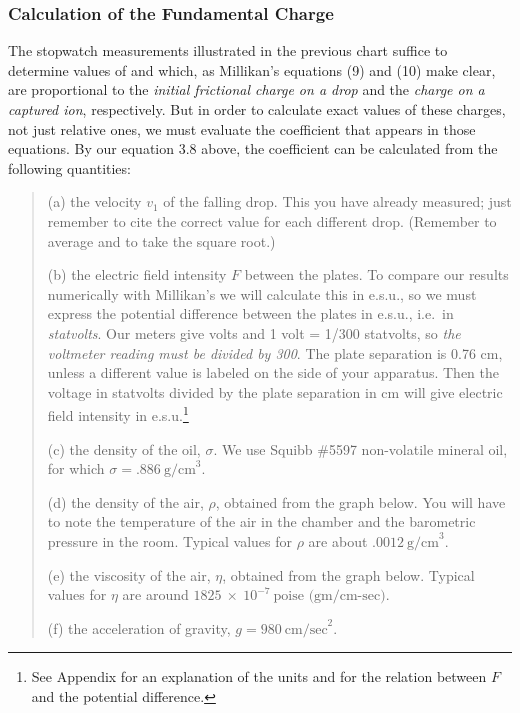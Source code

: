 \subsubsection*{Calculation of the Fundamental Charge}

The stopwatch measurements illustrated in the previous chart suffice to
determine values of and which, as Millikan's equations (9) and (10) make
clear, are proportional to the \emph{initial frictional charge on a
drop} and the \emph{charge on a captured ion}, respectively. But in
order to calculate exact values of these charges, not just relative
ones, we must evaluate the coefficient that appears in those equations.
By our equation 3.8 above, the coefficient can be calculated
from the following quantities:

\begin{quote}
(a) the velocity $v_1$ of the falling drop. This you have already
measured; just remember to cite the correct value for each different
drop. (Remember to average and to take the square root.)

(b) the electric field intensity $F$ between the plates. To compare our 
results numerically with Millikan's we will calculate this in e.s.u., 
so we must express the potential difference between the
plates in e.s.u., i.e.\ in \emph{statvolts}. Our meters give volts and 1
volt = 1/300 statvolts, so \emph{the voltmeter reading must be divided
by 300}. The plate separation is 0.76 cm, unless a different value is
labeled on the side of your apparatus. Then the voltage in statvolts
divided by the plate separation in cm will give electric field intensity
in e.s.u.\footnote{See Appendix for an explanation of the units and for the
  relation between $F$ and the potential difference.}

(c) the density of the oil, $\sigma$. We use Squibb \#5597 non-volatile
mineral oil, for which $\sigma = .886\ \text{g/cm}^3$.

(d) the density of the air, $\rho$, obtained from the graph below. You
will have to note the temperature of the air in the chamber and the 
barometric pressure in the room. Typical values for
$\rho$ are about $.0012\ \text{g/cm}^3$.

(e) the viscosity of the air, $\eta$, obtained from the graph below.
Typical values for $\eta$ are around $1825\ \times\ 10^{-7}\ \text{poise (gm/cm-sec)}.$

(f) the acceleration of gravity, $g = 980\ \text{cm/sec}^2$.
\end{quote}


